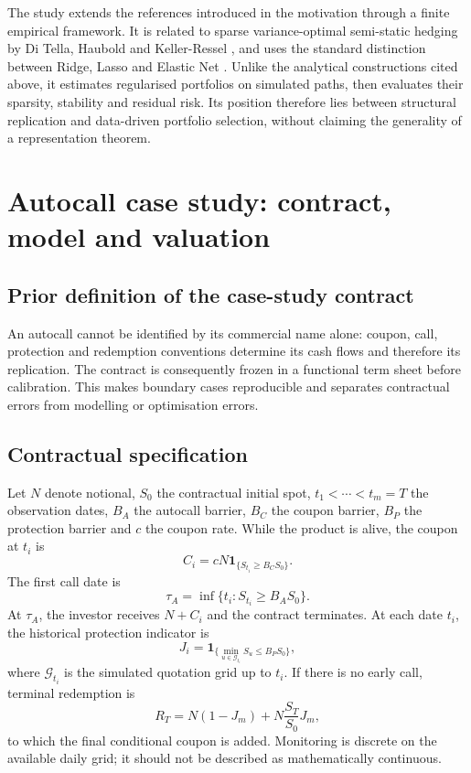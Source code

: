 \documentclass[12pt,a4paper]{article}
\newcommand{\1}{\mathbf{1}}
\begin{document}
The study extends the references introduced in the motivation through a finite empirical framework. It is related to sparse variance-optimal semi-static hedging by Di Tella, Haubold and Keller-Ressel \cite{ditella2019}, and uses the standard distinction between Ridge, Lasso and Elastic Net \cite{hastie2009}. Unlike the analytical constructions cited above, it estimates regularised portfolios on simulated paths, then evaluates their sparsity, stability and residual risk. Its position therefore lies between structural replication and data-driven portfolio selection, without claiming the generality of a representation theorem.

\section{Autocall case study: contract, model and valuation}

\subsection{Prior definition of the case-study contract}

An autocall cannot be identified by its commercial name alone: coupon, call,
protection and redemption conventions determine its cash flows and therefore
its replication. The contract is consequently frozen in a functional term
sheet before calibration. This makes boundary cases reproducible and separates
contractual errors from modelling or optimisation errors.

\subsection{Contractual specification}

Let $N$ denote notional, $S_0$ the contractual initial spot, $t_1<\cdots<t_m=T$ the observation dates, $B_A$ the autocall barrier, $B_C$ the coupon barrier, $B_P$ the protection barrier and $c$ the coupon rate. While the product is alive, the coupon at $t_i$ is
\begin{equation}
 C_i=cN\1_{\{S_{t_i}\geq B_CS_0\}}.
\label{eq:coupon}
\end{equation}
The first call date is
\begin{equation}
 \tau_A=\inf\{t_i:S_{t_i}\geq B_AS_0\}.
\label{eq:first-call}
\end{equation}
At $\tau_A$, the investor receives $N+C_i$ and the contract terminates. At each
date $t_i$, the historical protection indicator is
\begin{equation}
 J_i=\1_{\{\min_{u\in\mathcal G_{t_i}}S_u\leq B_PS_0\}},
\label{eq:barrier-state}
\end{equation}
where $\mathcal G_{t_i}$ is the simulated quotation grid up to $t_i$. If there
is no early call, terminal redemption is
\begin{equation}
 R_T=N(1-J_m)+N\frac{S_T}{S_0}J_m,
\label{eq:terminal-redemption}
\end{equation}
to which the final conditional coupon is added. Monitoring is discrete on the available daily grid; it should not be described as mathematically continuous.
\end{document}
